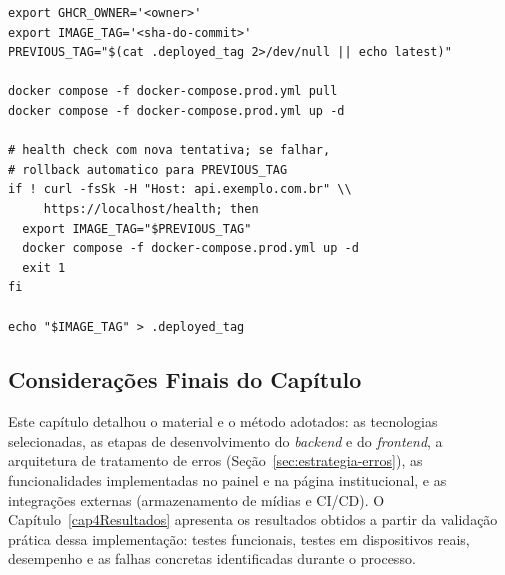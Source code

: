 \begin{verbatim}
export GHCR_OWNER='<owner>'
export IMAGE_TAG='<sha-do-commit>'
PREVIOUS_TAG="$(cat .deployed_tag 2>/dev/null || echo latest)"

docker compose -f docker-compose.prod.yml pull
docker compose -f docker-compose.prod.yml up -d

# health check com nova tentativa; se falhar,
# rollback automatico para PREVIOUS_TAG
if ! curl -fsSk -H "Host: api.exemplo.com.br" \\
     https://localhost/health; then
  export IMAGE_TAG="$PREVIOUS_TAG"
  docker compose -f docker-compose.prod.yml up -d
  exit 1
fi

echo "$IMAGE_TAG" > .deployed_tag
\end{verbatim}


\subsection*{Considerações Finais do Capítulo}

Este capítulo detalhou o material e o método adotados: as tecnologias selecionadas, as etapas de desenvolvimento do \textit{backend} e do \textit{frontend}, a arquitetura de tratamento de erros (Seção~\ref{sec:estrategia-erros}), as funcionalidades implementadas no painel e na página institucional, e as integrações externas (armazenamento de mídias e CI/CD). O Capítulo~\ref{cap4Resultados} apresenta os resultados obtidos a partir da validação prática dessa implementação: testes funcionais, testes em dispositivos reais, desempenho e as falhas concretas identificadas durante o processo.
